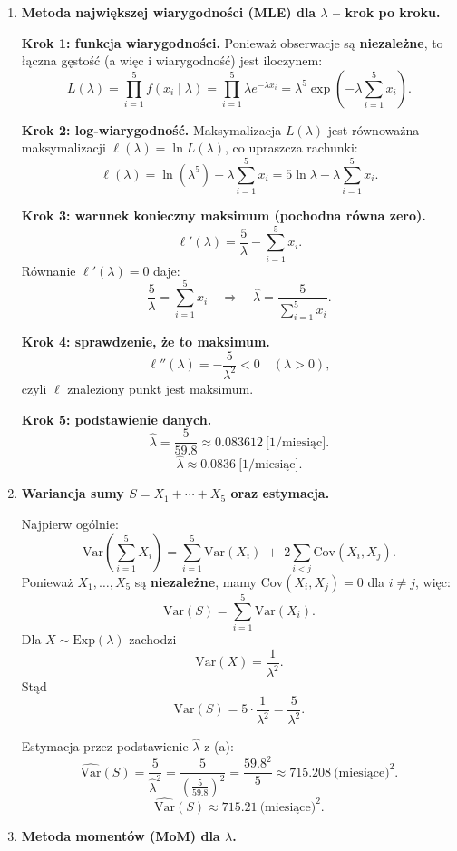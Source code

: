 \documentclass[polish, 10pt]{extarticle}
\begin{document}
\begin{enumerate}
\item[a)] \textbf{Metoda największej wiarygodności (MLE) dla $\lambda$ -- krok po kroku.}

\textbf{Krok 1: funkcja wiarygodności.}
Ponieważ obserwacje są \textbf{niezależne}, to łączna gęstość (a więc i wiarygodność) jest iloczynem:
\[
L(\lambda)=\prod_{i=1}^{5} f(x_i\mid \lambda)
=\prod_{i=1}^{5}\lambda e^{-\lambda x_i}
=\lambda^5 \exp\!\left(-\lambda\sum_{i=1}^5 x_i\right).
\]

\textbf{Krok 2: log-wiarygodność.}
Maksymalizacja $L(\lambda)$ jest równoważna maksymalizacji $\ell(\lambda)=\ln L(\lambda)$, co upraszcza rachunki:
\[
\ell(\lambda)=\ln\!\left(\lambda^5\right)-\lambda\sum_{i=1}^5 x_i
=5\ln\lambda-\lambda\sum_{i=1}^5 x_i.
\]

\textbf{Krok 3: warunek konieczny maksimum (pochodna równa zero).}
\[
\ell'(\lambda)=\frac{5}{\lambda}-\sum_{i=1}^5 x_i.
\]
Równanie $\ell'(\lambda)=0$ daje:
\[
\frac{5}{\lambda}=\sum_{i=1}^5 x_i
\quad\Longrightarrow\quad
\hat\lambda=\frac{5}{\sum_{i=1}^5 x_i}.
\]

\textbf{Krok 4: sprawdzenie, że to maksimum.}
\[
\ell''(\lambda)=-\frac{5}{\lambda^2}<0 \quad (\lambda>0),
\]
czyli $\ell$ znaleziony punkt jest maksimum.

\textbf{Krok 5: podstawienie danych.}
\[
\hat\lambda=\frac{5}{59.8}\approx 0.083612\ \text{[1/miesiąc]}.
\]
\[
\boxed{\hat\lambda \approx 0.0836\ \text{[1/miesiąc]}.}
\]

\item[b)] \textbf{Wariancja sumy $S=X_1+\cdots+X_5$ oraz estymacja.}

Najpierw ogólnie:
\[
\mathrm{Var}\!\left(\sum_{i=1}^5 X_i\right)
=\sum_{i=1}^5 \mathrm{Var}(X_i)\;+\;2\sum_{i<j}\mathrm{Cov}(X_i,X_j).
\]
Ponieważ $X_1,\dots,X_5$ są \textbf{niezależne}, mamy $\mathrm{Cov}(X_i,X_j)=0$ dla $i\neq j$, więc:
\[
\mathrm{Var}(S)=\sum_{i=1}^5 \mathrm{Var}(X_i).
\]
Dla $X\sim\mathrm{Exp}(\lambda)$ zachodzi
\[
\mathrm{Var}(X)=\frac{1}{\lambda^2}.
\]
Stąd
\[
\mathrm{Var}(S)=5\cdot \frac{1}{\lambda^2}=\frac{5}{\lambda^2}.
\]

Estymacja przez podstawienie $\hat\lambda$ z (a):
\[
\widehat{\mathrm{Var}}(S)=\frac{5}{\hat\lambda^2}
=\frac{5}{\left(\frac{5}{59.8}\right)^2}
=\frac{59.8^2}{5}
\approx 715.208\ \text{(miesiące)}^2.
\]
\[
\boxed{\widehat{\mathrm{Var}}(S)\approx 715.21\ \text{(miesiące)}^2.}
\]

\item[c)] \textbf{Metoda momentów (MoM) dla $\lambda$.}


\end{enumerate}
\end{document}
